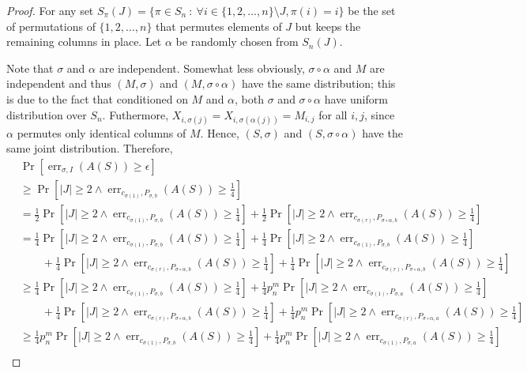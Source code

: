 \documentclass[10pt]{article}
\DeclareMathOperator{\err}{err}
\begin{document}
\begin{proof}
For any set $S_\pi(J) = \{ \pi \in S_n ~:~ \forall i \in \{1,2,\dots,n\}
\setminus J, \pi(i) = i \}$ be the set of permutations of $\{1,2,\dots,n\}$ that
permutes elements of $J$ but keeps the remaining columns in place. Let $\alpha$
be randomly chosen from $S_n(J)$.

Note that $\sigma$ and $\alpha$ are independent. Somewhat less obviously,
$\sigma \circ \alpha$ and $M$ are independent and thus $(M,\sigma)$ and $(M,
\sigma \circ \alpha)$ have the same distribution; this is due to the fact that
conditioned on $M$ and $\alpha$, both $\sigma$ and $\sigma \circ \alpha$ have uniform
distribution over $S_n$. Futhermore, $X_{i,\sigma(j)} = X_{i,\sigma(\alpha(j))} =
M_{i,j}$ for all $i,j$, since $\alpha$ permutes only identical columns of $M$.
Hence, $(S,\sigma)$ and $(S,\sigma \circ \alpha)$ have the same joint
distribution. Therefore,
\begin{align*}
& \Pr \left[ \err_{\sigma,I}(A(S)) \ge \epsilon \right] \\
& \ge \Pr \left[ |J| \ge 2 \wedge \err_{c_{\sigma(1)},P_{\sigma, b}}(A(S)) \ge \frac{1}{4} \right] \\
& = \frac{1}{2} \Pr \left[ |J| \ge 2 \wedge \err_{c_{\sigma(1)},P_{\sigma, b}}(A(S)) \ge \frac{1}{4} \right] + \frac{1}{2} \Pr \left[ |J| \ge 2 \wedge \err_{c_{\sigma(r)},P_{\sigma \circ \alpha, b}}(A(S)) \ge \frac{1}{4} \right]  \\
& = \frac{1}{4} \Pr \left[ |J| \ge 2 \wedge \err_{c_{\sigma(1)},P_{\sigma, b}}(A(S)) \ge \frac{1}{4} \right] + \frac{1}{4} \Pr \left[ |J| \ge 2 \wedge \err_{c_{\sigma(1)},P_{\sigma, b}}(A(S)) \ge \frac{1}{4} \right] \\
& \qquad + \frac{1}{4} \Pr \left[ |J| \ge 2 \wedge \err_{c_{\sigma(r)},P_{\sigma \circ \alpha, b}}(A(S)) \ge \frac{1}{4} \right] + \frac{1}{4} \Pr \left[ |J| \ge 2 \wedge \err_{c_{\sigma(r)},P_{\sigma \circ \alpha, b}}(A(S)) \ge \frac{1}{4} \right] \\
& \ge \frac{1}{4} \Pr \left[ |J| \ge 2 \wedge \err_{c_{\sigma(1)},P_{\sigma, b}}(A(S)) \ge \frac{1}{4} \right] + \frac{1}{4} p_n^m  \Pr \left[ |J| \ge 2 \wedge \err_{c_{\sigma(1)},P_{\sigma, a}}(A(S)) \ge \frac{1}{4} \right] \\
& \qquad + \frac{1}{4} \Pr \left[ |J| \ge 2 \wedge \err_{c_{\sigma(r)},P_{\sigma \circ \alpha, b}}(A(S)) \ge \frac{1}{4} \right] + \frac{1}{4} p_n^m \Pr \left[ |J| \ge 2 \wedge \err_{c_{\sigma(r)},P_{\sigma \circ \alpha, a}}(A(S)) \ge \frac{1}{4} \right] \\
& \ge \frac{1}{4} p_n^m \Pr \left[ |J| \ge 2 \wedge \err_{c_{\sigma(1)},P_{\sigma, b}}(A(S)) \ge \frac{1}{4} \right] + \frac{1}{4} p_n^m  \Pr \left[ |J| \ge 2 \wedge \err_{c_{\sigma(1)},P_{\sigma, a}}(A(S)) \ge \frac{1}{4} \right] \\

\end{align*}
\end{proof}
\end{document}
